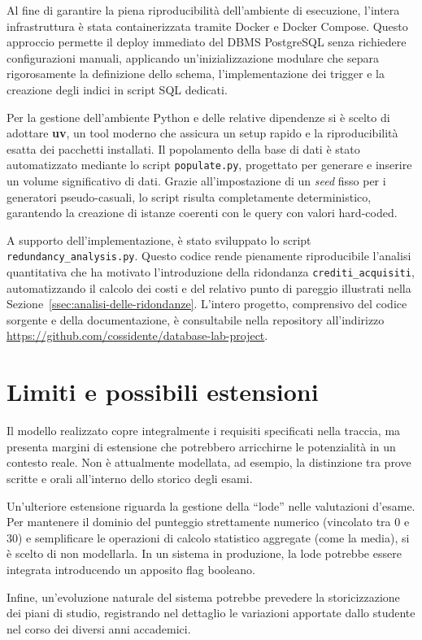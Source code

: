Al fine di garantire la piena riproducibilità dell'ambiente di esecuzione, l'intera infrastruttura è stata containerizzata tramite Docker e Docker Compose. Questo approccio permette il deploy immediato del DBMS PostgreSQL senza richiedere configurazioni manuali, applicando un'inizializzazione modulare che separa rigorosamente la definizione dello schema, l'implementazione dei trigger e la creazione degli indici in script SQL dedicati.

Per la gestione dell'ambiente Python e delle relative dipendenze si è scelto di adottare \textbf{uv}, un tool moderno che assicura un setup rapido e la riproducibilità esatta dei pacchetti installati. Il popolamento della base di dati è stato automatizzato mediante lo script \texttt{populate.py}, progettato per generare e inserire un volume significativo di dati. Grazie all'impostazione di un \textit{seed} fisso per i generatori pseudo-casuali, lo script risulta completamente deterministico, garantendo la creazione di istanze coerenti con le query con valori hard-coded.

A supporto dell'implementazione, è stato sviluppato lo script \texttt{redundancy\_analysis.py}. Questo codice rende pienamente riproducibile l'analisi quantitativa che ha motivato l'introduzione della ridondanza \texttt{crediti\_acquisiti}, automatizzando il calcolo dei costi e del relativo punto di pareggio illustrati nella Sezione~\ref{ssec:analisi-delle-ridondanze}. L'intero progetto, comprensivo del codice sorgente e della documentazione, è consultabile nella repository all'indirizzo \url{https://github.com/cossidente/database-lab-project}.

\section{Limiti e possibili estensioni}
\label{sec:limiti-e-possibili-estensioni}

Il modello realizzato copre integralmente i requisiti specificati nella traccia, ma presenta margini di estensione che potrebbero arricchirne le potenzialità in un contesto reale. Non è attualmente modellata, ad esempio, la distinzione tra prove scritte e orali all'interno dello storico degli esami.

Un'ulteriore estensione riguarda la gestione della \enquote{lode} nelle valutazioni d'esame. Per mantenere il dominio del punteggio strettamente numerico (vincolato tra 0 e 30) e semplificare le operazioni di calcolo statistico aggregate (come la media), si è scelto di non modellarla. In un sistema in produzione, la lode potrebbe essere integrata introducendo un apposito flag booleano.

Infine, un'evoluzione naturale del sistema potrebbe prevedere la storicizzazione dei piani di studio, registrando nel dettaglio le variazioni apportate dallo studente nel corso dei diversi anni accademici.